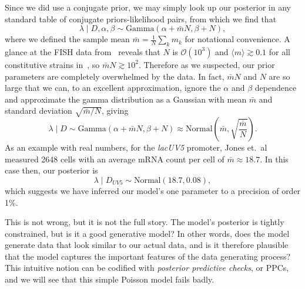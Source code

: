 Since we did use a conjugate prior, we may simply look up our posterior in any
standard table of conjugate priors-likelihood pairs, from which we find that
\begin{equation}
\lambda\mid D,\alpha,\beta
\sim \text{Gamma}\left(\alpha + \bar{m}N, \beta + N\right),
\end{equation}
where we defined the sample mean $\bar{m} = \frac{1}{N}\sum_k m_k$ for
notational convenience. A glance at the FISH data from~\cite{Jones2014} reveals
that $N$ is $\mathcal{O}(10^3)$ and $\langle m\rangle \gtrsim 0.1$ for all
constitutive strains in~\cite{Jones2014}, so $\bar{m}N \gtrsim 10^2$. Therefore
as we suspected, our prior parameters are completely overwhelmed by the data. In
fact, $\bar{m}N$ and $N$ are so large that we can, to an excellent
approximation, ignore the $\alpha$ and $\beta$ dependence and approximate the
gamma distribution as a Gaussian with mean $\bar{m}$ and standard deviation
$\sqrt{\bar{m}/N}$, giving
\begin{equation}
\lambda\mid D
\sim \text{Gamma}\left(\alpha + \bar{m}N, \beta + N\right)
\approx \text{Normal}\left(\bar{m}, \sqrt{\frac{\bar{m}}{N}}\right).
\end{equation}
As an example with real numbers, for the \textit{lacUV5} promoter, Jones et.\
al~\cite{Jones2014} measured 2648 cells with an average mRNA count per cell of
$\bar{m} \approx 18.7$. In this case then, our posterior is
\begin{equation}
\lambda\mid D_{UV5}
\sim \text{Normal}\left(18.7, 0.08\right),
\end{equation}
which suggests we have inferred our model's one parameter to a precision of
order 1\%.

This is not wrong, but it is not the full story. The model's posterior is
tightly constrained, but is it a good generative model? In other words, does the
model generate data that look similar to our actual data, and is it therefore
plausible that the model captures the important features of the data generating
process? This intuitive notion can be codified with \textit{posterior predictive
checks}, or PPCs, and we will see that this simple Poisson model fails badly.

